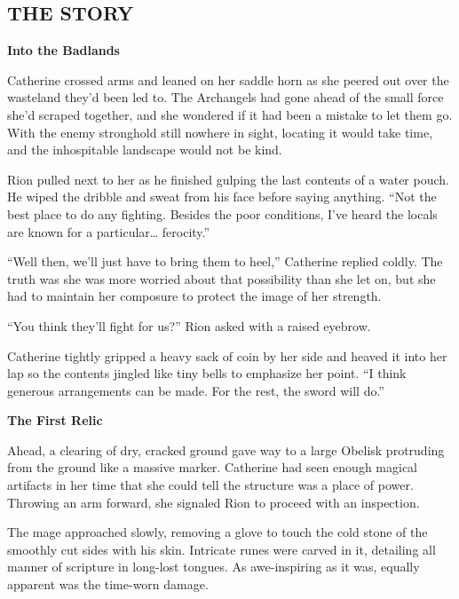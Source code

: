 
\newpage

\begin{multicols*}{2}

\subsection*{\MakeUppercase{The story}}

\textbf{Into the Badlands}

Catherine crossed arms and leaned on her saddle horn as she peered out over the wasteland they'd been led to. The Archangels had gone ahead of the small force she'd scraped together, and she wondered if it had been a mistake to let them go. With the enemy stronghold still nowhere in sight, locating it would take time, and the inhospitable landscape would not be kind.

Rion pulled next to her as he finished gulping the last contents of a water pouch. He wiped the dribble and sweat from his face before saying anything. ``Not the best place to do any fighting. Besides the poor conditions, I've heard the locals are known for a particular… ferocity.''

``Well then, we'll just have to bring them to heel,'' Catherine replied coldly. The truth was she was more worried about that possibility than she let on, but she had to maintain her composure to protect the image of her strength.

``You think they'll fight for us?'' Rion asked with a raised eyebrow.

Catherine tightly gripped a heavy sack of coin by her side and heaved it into her lap so the contents jingled like tiny bells to emphasize her point. ``I think generous arrangements can be made. For the rest, the sword will do.''



\textbf{The First Relic}

Ahead, a clearing of dry, cracked ground gave way to a large Obelisk protruding from the ground like a massive marker. Catherine had seen enough magical artifacts in her time that she could tell the structure was a place of power. Throwing an arm forward, she signaled Rion to proceed with an inspection.

The mage approached slowly, removing a glove to touch the cold stone of the smoothly cut sides with his skin. Intricate runes were carved in it, detailing all manner of scripture in long-lost tongues. As awe-inspiring as it was, equally apparent was the time-worn damage.


\end{multicols*}
